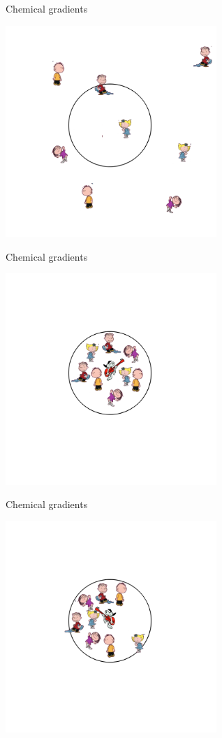 \documentclass{beamer}
\begin{document}
\begin{frame}{Chemical gradients}
\begin{center}
    \includegraphics[height=8cm]{children2.png}
\end{center}
\end{frame}

\begin{frame}{Chemical gradients}
\begin{center}
    \includegraphics[height=8cm]{children3.png}
\end{center}
\end{frame}

\begin{frame}{Chemical gradients}
\begin{center}
    \includegraphics[height=8cm]{children4.png}
\end{center}
\end{frame}
\end{document}
